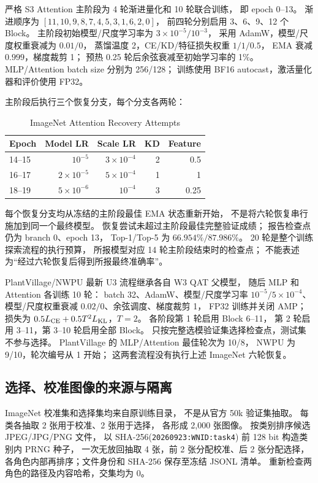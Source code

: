 严格 S3 Attention 主阶段为 4 轮渐进量化和 10 轮联合训练，
即 epoch 0--13。
渐进顺序为 $[11,10,9,8,7,4,5,3,1,6,2,0]$，
前四轮分别启用 3、6、9、12 个 Block。
主阶段初始模型/尺度学习率为 $3\times10^{-5}/10^{-3}$，
采用 AdamW，模型/尺度权重衰减为 $0.01/0$，
蒸馏温度 2，CE/KD/特征损失权重 $1/1/0.5$，
EMA 衰减 $0.999$，梯度裁剪 1；
预热 0.25 轮后余弦衰减至初始学习率的 1\%。
MLP/Attention batch size 分别为 256/128；
训练使用 BF16 autocast，激活量化器和评价使用 FP32。

主阶段后执行三个恢复分支，每个分支各两轮：
\begin{table}[t]
\centering
\caption{ImageNet Attention Recovery Attempts}
\label{tab:supp_recovery_attempts}
\footnotesize
\setlength{\tabcolsep}{3pt}
\begin{tabular}{@{}lrrrr@{}}
\toprule
Epoch & Model LR & Scale LR & KD & Feature \\
\midrule
14--15 & $10^{-5}$ & $3\times10^{-4}$ & 2 & 0.5 \\
16--17 & $2\times10^{-5}$ & $5\times10^{-4}$ & 1 & 1 \\
18--19 & $5\times10^{-6}$ & $10^{-4}$ & 3 & 0.25 \\
\bottomrule
\end{tabular}
\end{table}
每个恢复分支均从冻结的主阶段最佳 EMA 状态重新开始，
不是将六轮恢复串行施加到同一个最终模型。
恢复尝试未超过主阶段最佳完整验证成绩；
报告检查点仍为 branch 0、epoch 13，
Top-1/Top-5 为 $66.954\%/87.986\%$。
20 轮是整个训练探索流程的执行预算，
所报模型对应 14 轮主阶段结束时的检查点；
不能表述为“经过六轮恢复后得到所报最终准确率”。

PlantVillage/NWPU 最新 U3 流程继承各自 W3 QAT 父模型，
随后 MLP 和 Attention 各训练 10 轮：
batch 32、AdamW、模型/尺度学习率 $10^{-5}/5\times10^{-4}$、
模型/尺度权重衰减 $0.02/0$、余弦调度、梯度裁剪 1，
FP32 训练并关闭 AMP；
损失为 $0.5L_{\rm CE}+0.5T^2L_{\rm KL}$，$T=2$。
各阶段第 1 轮启用 Block 6--11，
第 2 轮启用 3--11，第 3--10 轮启用全部 Block。
只按完整选模验证集选择检查点，测试集不参与选择。
PlantVillage 的 MLP/Attention 最佳轮次为 10/8，
NWPU 为 9/10，轮次编号从 1 开始；
这两套流程没有执行上述 ImageNet 六轮恢复。

\subsection{选择、校准图像的来源与隔离}
ImageNet 校准集和选择集均来自原训练目录，
不是从官方 50k 验证集抽取。
每类各抽取 2 张用于校准、2 张用于选择，
各形成 2,000 张图像。
按类别排序候选 JPEG/JPG/PNG 文件，
以 SHA-256(\texttt{20260923:WNID:task4}) 前 128 bit 构造类别内 PRNG 种子，
一次无放回抽取 4 张，前 2 张分配校准、后 2 张分配选择，
各角色内部再排序；文件身份和 SHA-256 保存至冻结 JSONL 清单。
重新检查两角色的路径及内容哈希，交集均为 0。

